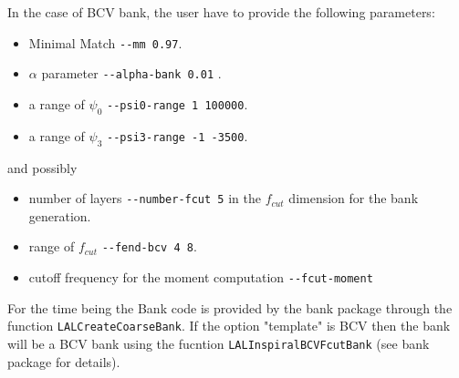 \begin{entry}
In the case of BCV bank, the user have to provide the following parameters: 

\begin{itemize}
\item Minimal Match \verb$--mm 0.97$.
\item $\alpha$ parameter \verb$--alpha-bank 0.01$ .
\item a range of $\psi_0$ \verb$--psi0-range 1 100000$.
\item a range of $\psi_3$ \verb$--psi3-range -1 -3500$.
\end{itemize}
 and possibly
\begin{itemize}
\item number of layers \verb$--number-fcut 5$ in the $f_{cut}$ dimension for the bank generation. 
\item range of $f_{cut}$ \verb$--fend-bcv 4 8$.
\item cutoff frequency for the moment computation \verb$--fcut-moment$
\end{itemize}

For the time being the Bank code is provided by the bank package through the function
\texttt{LALCreateCoarseBank}. If the option "template" is BCV then the bank will be a BCV
 bank using the fucntion \texttt{LALInspiralBCVFcutBank} (see bank package for details).






\end{entry}
